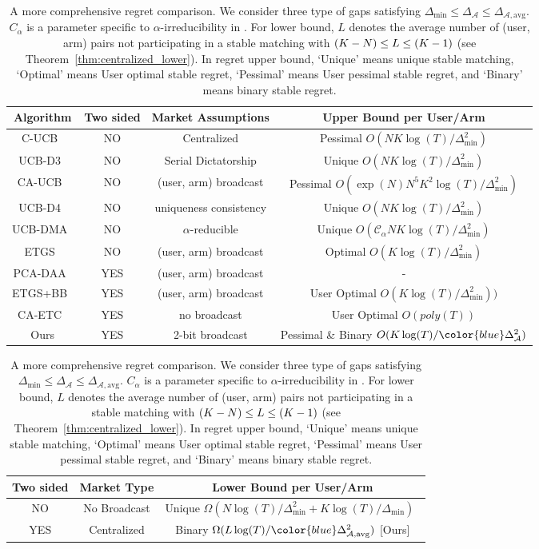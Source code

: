 \documentclass{article}
\begin{document}
\begin{table}[htb]
\centering
\small
\begin{tabular}{ |c|c|c|c| } 
 \hline
 \textbf{Algorithm} & \textbf{Two sided} & \textbf{Market Assumptions}  & \textbf{Upper Bound per User/Arm}   \\ 
 \hline
 C-UCB~\cite{liu_centralized_2020} & NO & Centralized & Pessimal $O(NK\log(T)/ \Delta_{\min}^2)$ \\ 
 \hline
 UCB-D3~\cite{ucbd3} & NO & Serial Dictatorship  & Unique  $O(NK\log(T)/ \Delta_{\min}^2)$  \\
 \hline
 CA-UCB~\cite{liu_decentralized_2021} & NO & (user, arm) broadcast  & Pessimal $O(\exp(N)N^5K^2\log(T)/ \Delta_{\min}^2)$  \\ 
  \hline
 UCB-D4~\cite{basu_2021} & NO & uniqueness consistency  & Unique $O(NK\log(T)/ \Delta_{\min}^2)$ \\
 \hline
 UCB-DMA~\cite{maheshwari_2022} & NO & $\alpha$-reducible  & Unique $O(\mathcal{C}_{\alpha}NK\log(T)/ \Delta_{\min}^2)$  \\
  \hline
 ETGS~\cite{kong2023playeroptimal} & NO & (user, arm) broadcast & Optimal $O(K\log(T)/ \Delta_{\min}^2)$ \\ 
 \hline
 PCA-DAA~\cite{pokharel2023converging} & YES & (user, arm) broadcast  & -  \\
 \hline
 ETGS+BB~\cite{tejas_2024} & YES & (user, arm) broadcast  & User Optimal  $O(K\log(T)/ \Delta^2_{\min}))$ \\
 \hline
 CA-ETC~\cite{tejas_2024} & YES & no broadcast  & User Optimal  $O(poly(T))$ \\
 \hline
 Ours & YES & 2-bit broadcast  & Pessimal \& Binary   $O(K\log(T)/ {\color{blue}\Delta_{\mathcal{A}}^2})$  \\
 \hline
\end{tabular}
\begin{tabular}{ |c|c|c| }
\hline
\textbf{Two sided} & \textbf{Market Type} & \textbf{Lower Bound per User/Arm}\\
\hline
NO & No Broadcast   & Unique $\Omega(N\log(T)/ \Delta_{\min}^2 + K\log(T)/ \Delta_{\min})$~\cite{ucbd3} \\
\hline
YES & Centralized & Binary $\Omega(L\log(T)/ {\color{blue}\Delta_{\mathcal{A}, \mathrm{avg}}^2})$ [Ours] \\
\hline
\end{tabular}
 \caption{A more comprehensive regret comparison. We consider three type of gaps satisfying $\Delta_{\min} \leq \Delta_{\mathcal{A}}\leq \Delta_{\mathcal{A}, \mathrm{avg}}$. $C_{\alpha}$ is a parameter specific to $\alpha$-irreducibility  in \cite{maheshwari_2022}. 
 For lower bound, $L$ denotes the average number of (user, arm) pairs not participating in a stable matching with $\small (K-N) \leq L \leq (K-1)$ (see Theorem~\ref{thm:centralized_lower}). In regret upper bound, `Unique' means unique stable matching, `Optimal' means User optimal stable regret, `Pessimal' means User pessimal stable regret, and `Binary' means binary stable regret. 
 }
 \label{tab:regret_bounds_long}
 \vspace{-1.5em}
\end{table}
\end{document}

